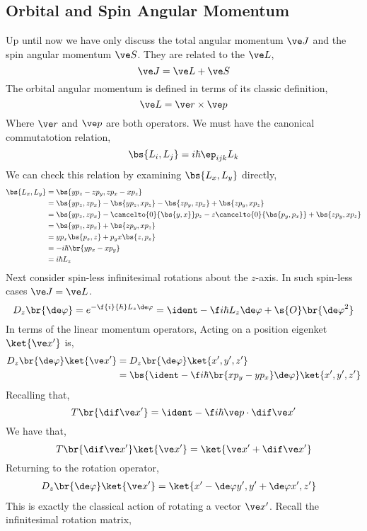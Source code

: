 \documentclass{article}
\begin{document}
\subsection{Orbital and Spin Angular Momentum}
Up until now we have only discuss the total angular momentum $\ve J$ and the spin angular momentum $\ve S$. They are related to the  $\ve L$,
\[ \ve J = \ve L + \ve S \]
The orbital angular momentum is defined in terms of its classic definition,
\[ \ve L = \ve r \times \ve p \]
Where $\ve r$ and $\ve p$ are both operators. We must have the canonical commutatotion relation,
\[ \bs{L_i, L_j} = i\hbar \ep_{ijk}L_k \]
We can check this relation by examining $\bs{L_x, L_y}$ directly,
\begin{align*}
    \bs{L_x, L_y}
    &= \bs{y p_z - z p_y, zp_x - x p_z} \\
    &= \bs{y p_z, zp_x} - \bs{y p_z, xp_z} - \bs{z p_y, zp_x} + \bs{z p_y, xp_z}\\
    &= \bs{y p_z, zp_x} - \cancelto{0}{\bs{y, x}}p_z - z\cancelto{0}{\bs{ p_y, p_x}} + \bs{z p_y, xp_z}\\
    &= \bs{y p_z, zp_x} + \bs{z p_y, xp_z}\\
    &= yp_x\bs{p_z, z} + p_y x \bs{z, p_z}\\
    &= -i\hbar \br{yp_x - xp_y}\\
    &= i \hbar L_z
\end{align*}
Next consider spin-less infinitesimal rotations about the $z$-axis. In such spin-less cases $\ve J = \ve L$.
\[ D_z \br{\de \varphi} = e^{- \f{i}{\hbar} L_z \de \varphi} = \ident - \f i \hbar L_z \de \varphi + \s{O}\br{{\de \varphi}^2} \]
In terms of the linear momentum operators,
Acting on a position eigenket $\ket{\ve x'}$ is,
\begin{align*}
D_z \br{\de \varphi}\ket{\ve x'}
&= D_z \br{\de \varphi}\ket{x', y', z'} \\
&= \bs{\ident - \f i \hbar \br{xp_y - yp_x}\de \varphi}\ket{x', y', z'}
\end{align*}
Recalling that,
\[ T\br{\dif \ve x'} = \ident - \f i \hbar \ve p \cdot \dif \ve x' \]
We have that,
\[ T\br{\dif \ve x'}\ket{\ve x'} = \ket{\ve x' + \dif \ve x'} \]
Returning to the rotation operator,
\begin{align*}
D_z \br{\de \varphi}\ket{\ve x'}
&= \ket{x' - \de \varphi y', y' + \de \varphi x', z'}
\end{align*}
This is exactly the classical action of rotating a vector $\ve x'$. Recall the infinitesimal rotation matrix,
\end{document}
